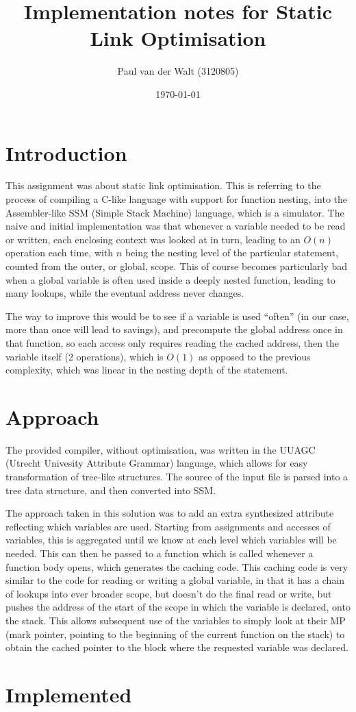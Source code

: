 \documentclass[a4paper]{article}
\author{Paul van der Walt (3120805)}
\date{\today}
\title{Implementation notes for Static Link Optimisation}
\begin{document}
\maketitle
\tableofcontents

\section{Introduction}

This assignment was about static link optimisation. This is referring to the process of compiling a C-like language with support for function nesting, into the Assembler-like SSM (Simple Stack Machine) language, which is a simulator. 
The naive and initial implementation was that whenever a variable needed to be read or written, each enclosing context was looked at in turn, leading to an $O(n)$ operation each time, with $n$ being
the nesting level of the particular statement, counted from the outer, or global, scope. This of course becomes particularly bad when a global variable is often used inside a deeply nested function, leading to many lookups, while the eventual address never changes.

The way to improve this would be to see if a variable is used ``often'' (in our case, more than once will lead to savings), and precompute the global address once in that function, so each access only requires reading the cached address, then the variable itself (2 operations), which is $O(1)$ as opposed to the previous complexity, which was linear in the nesting depth of the statement. 

\section{Approach}

The provided compiler, without optimisation, was written in the UUAGC (Utrecht Univesity Attribute Grammar) language, which allows for easy transformation of tree-like structures. The source of the input file is parsed into a tree data structure, and 
then converted into SSM. 

The approach taken in this solution was to add an extra synthesized attribute reflecting which variables are used. Starting from assignments and accesses of variables, this is aggregated until we know at each level which variables will be needed. This can then
be passed to a function which is called whenever a function body opens, which generates the caching code. This caching code is very similar to the code for reading or writing a global variable, in that it has a chain of lookups into ever broader scope, but doesn't
do the final read or write, but pushes the address of the start of the scope in which the variable is declared, onto the stack. This allows subsequent use of the variables to simply look at their MP (mark pointer, pointing to the beginning of the current function on 
the stack) to obtain the cached pointer to the block where the requested variable was declared. 

\section{Implemented}
\end{document}
